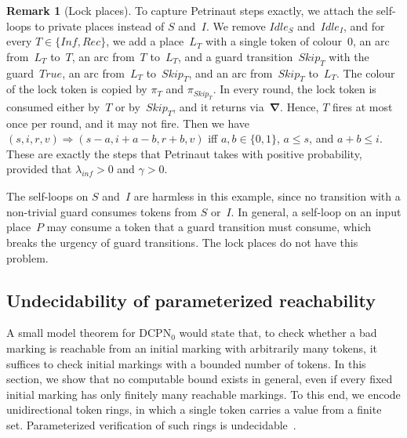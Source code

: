 \documentclass[11pt]{article}
\theoremstyle{definition}
\newcommand{\bfNabla}{\boldsymbol{\nabla}}
\newcommand{\DCPN}[1]{\texorpdfstring{\textup{DCPN}\ensuremath{_{#1}}}{DCPN#1}}
\newtheorem{remark}{Remark}
\begin{document}
\begin{remark}[Lock places]\label{rem:locks}
  To capture Petrinaut steps exactly, we attach the self-loops to private
  places instead of $S$ and~$I$. We remove $\mathit{Idle}_S$
  and~$\mathit{Idle}_I$, and for every $T \in \{\mathit{Inf},
  \mathit{Rec}\}$, we add a place~$L_T$ with a single token of colour~$0$,
  an arc from~$L_T$ to~$T$, an arc from~$T$ to~$L_T$, and a guard
  transition~$\mathit{Skip}_T$ with the guard~$\mathit{True}$, an arc
  from~$L_T$ to~$\mathit{Skip}_T$, and an arc from~$\mathit{Skip}_T$
  to~$L_T$. The colour of the lock token is copied by $\pi_T$ and
  $\pi_{\mathit{Skip}_T}$. In every round, the lock token is consumed either
  by~$T$ or by~$\mathit{Skip}_T$, and it returns via~$\bfNabla$. Hence,
  $T$ fires at most once per round, and it may not fire. Then we have
  $(s, i, r, v) \Rightarrow (s - a, i + a - b, r + b, v)$ iff
  $a, b \in \{0, 1\}$, $a \le s$, and $a + b \le i$. These are exactly the
  steps that Petrinaut takes with positive probability, provided that
  $\lambda_{\mathit{inf}} > 0$ and $\gamma > 0$.

  The self-loops on $S$ and~$I$ are harmless in this example, since no
  transition with a non-trivial guard consumes tokens from $S$ or~$I$. In
  general, a self-loop on an input place~$P$ may consume a token that a
  guard transition must consume, which breaks the urgency of guard
  transitions. The lock places do not have this problem.
\end{remark}

\subsection{Undecidability of parameterized reachability}\label{sec:undecidability}

A small model theorem for \DCPN{0} would state that, to check whether a bad
marking is reachable from an initial marking with arbitrarily many tokens, it
suffices to check initial markings with a bounded number of tokens. In this
section, we show that no computable bound exists in general, even if every
fixed initial marking has only finitely many reachable markings. To this end,
we encode unidirectional token rings, in which a single token carries a value
from a finite set. Parameterized verification of such rings is
undecidable~\cite{Suzuki1988,EmersonNamjoshi1995,EmersonNamjoshi2003}.
\end{document}

